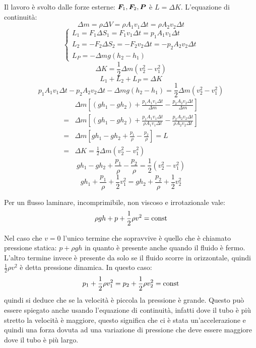 Il lavoro è svolto dalle forze esterne: $\boldsymbol{F}_1, \boldsymbol{F}_2, \boldsymbol{P}$ è $L=\Delta K$. L'equazione di continuità:
\[\Delta m=\rho \Delta V=\rho A_1 v_1\Delta t=\rho A_2 v_2 \Delta t\]
\[
   \left\{
   \begin{array}{lll}
      L_1=F_1\Delta S_1=F_1v_1\Delta t=p_1A_1v_1\Delta t    \\
      L_2=-F_2\Delta S_2=-F_2v_2\Delta t=-p_2A_2v_2\Delta t \\
      L_P=-\Delta mg(h_2-h_1)
   \end{array}
   \right.
\]
\[\Delta K=\frac{1}{2}\Delta m(v_2^2-v_1^2)\]
\[L_1+L_2+L_P=\Delta K\]
\[p_1A_1v_1\Delta t-p_2A_2v_2\Delta t-\Delta mg(h_2-h_1)=\frac{1}{2}\Delta m(v_2^2-v_1^2)\]
\begin{align*}
     & \Delta m\left[\left(gh_1-gh_2\right)+\frac{p_1A_1v_1\Delta t}{\Delta m}-\frac{p_2A_2v_2\Delta t}{\Delta m}\right]                       \\
   = & \Delta m\left[\left(gh_1-gh_2\right)+\frac{p_1A_1v_1\Delta t}{\rho A_1v_1\Delta t}-\frac{p_2A_2v_2\Delta t}{\rho A_2v_2\Delta t}\right] \\
   = & \Delta m\left[gh_1-gh_2+\frac{p_1}{\rho}-\frac{p_2}{\rho}\right]=L                                                                      \\
   = & \Delta K=\frac{1}{2}\Delta m(v_2^2-v_1^2)
\end{align*}
\[gh_1-gh_2+\frac{p_1}{\rho}-\frac{p_2}{\rho}=\frac{1}{2}(v_2^2-v_1^2)\]
\[gh_1+\frac{p_1}{\rho}+\frac{1}{2}v_1^2=gh_2+\frac{p_2}{\rho}+\frac{1}{2}v_2^2\]
\begin{Teo}[Bernoulli]
   Per un flusso laminare, incomprimibile, non viscoso e irrotazionale vale:
   \begin{equation}
      \rho gh+p+\frac{1}{2}\rho v^2=\text{const}
   \end{equation}
\end{Teo}
Nel caso che $v=0$ l'unico termine che sopravvive è quello che è chiamato pressione statica: $p+\rho gh$ in quanto è presente anche quando il fluido è fermo. L'altro termine invece è presente da solo se il fluido scorre in orizzontale, quindi $\frac{1}{2}\rho v^2$ è detta pressione dinamica. In questo caso:
\[
   p_1+\frac{1}{2}\rho v_1^2=p_2+\frac{1}{2}\rho v_2^2=\text{const}
\]
quindi si deduce che se la velocità è piccola la pressione è grande. Questo può essere spiegato anche usando l'equazione di continuità, infatti dove il tubo è più stretto la velocità è maggiore, questo significa che ci è stata un'accelerazione e quindi una forza dovuta ad una variazione di pressione che deve essere maggiore dove il tubo è più largo.

